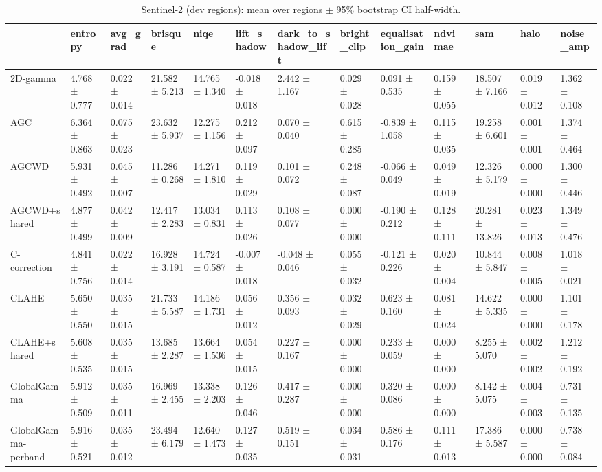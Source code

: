 \begin{table}[t]
\caption{Sentinel-2 (dev regions): mean over regions $\pm$ 95\% bootstrap CI half-width.}
\label{tab:s2_summary_dev}
\begin{tabular}{lllllllllllll}
\toprule
 & entropy & avg\_grad & brisque & niqe & lift\_shadow & dark\_to\_shadow\_lift & bright\_clip & equalisation\_gain & ndvi\_mae & sam & halo & noise\_amp \\
\midrule
2D-gamma & 4.768 ± 0.777 & 0.022 ± 0.014 & 21.582 ± 5.213 & 14.765 ± 1.340 & -0.018 ± 0.018 & 2.442 ± 1.167 & 0.029 ± 0.028 & 0.091 ± 0.535 & 0.159 ± 0.055 & 18.507 ± 7.166 & 0.019 ± 0.012 & 1.362 ± 0.108 \\
AGC & 6.364 ± 0.863 & 0.075 ± 0.023 & 23.632 ± 5.937 & 12.275 ± 1.156 & 0.212 ± 0.097 & 0.070 ± 0.040 & 0.615 ± 0.285 & -0.839 ± 1.058 & 0.115 ± 0.035 & 19.258 ± 6.601 & 0.001 ± 0.001 & 1.374 ± 0.464 \\
AGCWD & 5.931 ± 0.492 & 0.045 ± 0.007 & 11.286 ± 0.268 & 14.271 ± 1.810 & 0.119 ± 0.029 & 0.101 ± 0.072 & 0.248 ± 0.087 & -0.066 ± 0.049 & 0.049 ± 0.019 & 12.326 ± 5.179 & 0.000 ± 0.000 & 1.300 ± 0.446 \\
AGCWD+shared & 4.877 ± 0.499 & 0.042 ± 0.009 & 12.417 ± 2.283 & 13.034 ± 0.831 & 0.113 ± 0.026 & 0.108 ± 0.077 & 0.000 ± 0.000 & -0.190 ± 0.212 & 0.128 ± 0.111 & 20.281 ± 13.826 & 0.023 ± 0.013 & 1.349 ± 0.476 \\
C-correction & 4.841 ± 0.756 & 0.022 ± 0.014 & 16.928 ± 3.191 & 14.724 ± 0.587 & -0.007 ± 0.018 & -0.048 ± 0.046 & 0.055 ± 0.032 & -0.121 ± 0.226 & 0.020 ± 0.004 & 10.844 ± 5.847 & 0.008 ± 0.005 & 1.018 ± 0.021 \\
CLAHE & 5.650 ± 0.550 & 0.035 ± 0.015 & 21.733 ± 5.587 & 14.186 ± 1.731 & 0.056 ± 0.012 & 0.356 ± 0.093 & 0.032 ± 0.029 & 0.623 ± 0.160 & 0.081 ± 0.024 & 14.622 ± 5.335 & 0.000 ± 0.000 & 1.101 ± 0.178 \\
CLAHE+shared & 5.608 ± 0.535 & 0.035 ± 0.015 & 13.685 ± 2.287 & 13.664 ± 1.536 & 0.054 ± 0.015 & 0.227 ± 0.167 & 0.000 ± 0.000 & 0.233 ± 0.059 & 0.000 ± 0.000 & 8.255 ± 5.070 & 0.002 ± 0.002 & 1.212 ± 0.192 \\
GlobalGamma & 5.912 ± 0.509 & 0.035 ± 0.011 & 16.969 ± 2.455 & 13.338 ± 2.203 & 0.126 ± 0.046 & 0.417 ± 0.287 & 0.000 ± 0.000 & 0.320 ± 0.086 & 0.000 ± 0.000 & 8.142 ± 5.075 & 0.004 ± 0.003 & 0.731 ± 0.135 \\
GlobalGamma-perband & 5.916 ± 0.521 & 0.035 ± 0.012 & 23.494 ± 6.179 & 12.640 ± 1.473 & 0.127 ± 0.035 & 0.519 ± 0.151 & 0.034 ± 0.031 & 0.586 ± 0.176 & 0.111 ± 0.013 & 17.386 ± 5.587 & 0.000 ± 0.000 & 0.738 ± 0.084 \\

\end{tabular}
\end{table}
